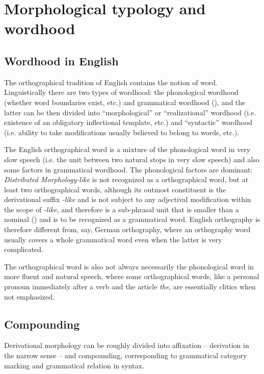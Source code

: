 \documentclass[UTF8, a4paper, oneside, scheme=plain, 12pt]{ctexbook}
\newcommand{\form}[1]{\emph{#1}}
\begin{document}
\section{Morphological typology and wordhood}

\subsection{Wordhood in English}\label{sec:pos.wordhood}

The orthographical tradition of English contains the notion of word.
Linguistically there are two types of wordhood:
the phonological wordhood (whether word boundaries exist, etc.)
and grammatical wordhood (), 
and the latter can be then divided into 
``morphological'' or ``realizational'' wordhood 
(i.e. existence of an obligatory inflectional template, etc.)
and ``syntactic'' wordhood
(i.e. ability to take modifications usually believed to belong to words, etc.).

The English orthographical word is 
a mixture of the phonological word in very slow speech
(i.e. the unit between two natural stops in very slow speech)
and also some factors in grammatical wordhood.
The phonological factors are dominant:
\form{Distributed Morphology-like} is not recognized as a orthographical word,
but at least two orthographical words,
although its outmost constituent is the derivational suffix \form{-like} 
and is not subject to any adjectival modification within the scope of \form{-like},
and therefore is a sub-phrasal unit  
that is smaller than a nominal ()
and is to be recognized as a grammatical word.
English orthography is therefore different from, say, 
German orthography,
where an orthography word usually covers a whole grammatical word 
even when the latter is very complicated.

The orthographical word is also not always necessarily the phonological word 
in more fluent and natural speech, 
where some orthographical words, 
like a personal pronoun immediately after a verb 
and the article \form{the}, 
are essentially clitics when not emphasized.

\subsection{Compounding}\label{sec:pos.overview.derivation.compound}

Derivational morphology can be roughly divided into 
affixation -- derivation in the narrow sense -- and compounding,
corresponding to grammatical category marking and grammatical relation in syntax.
\end{document}

